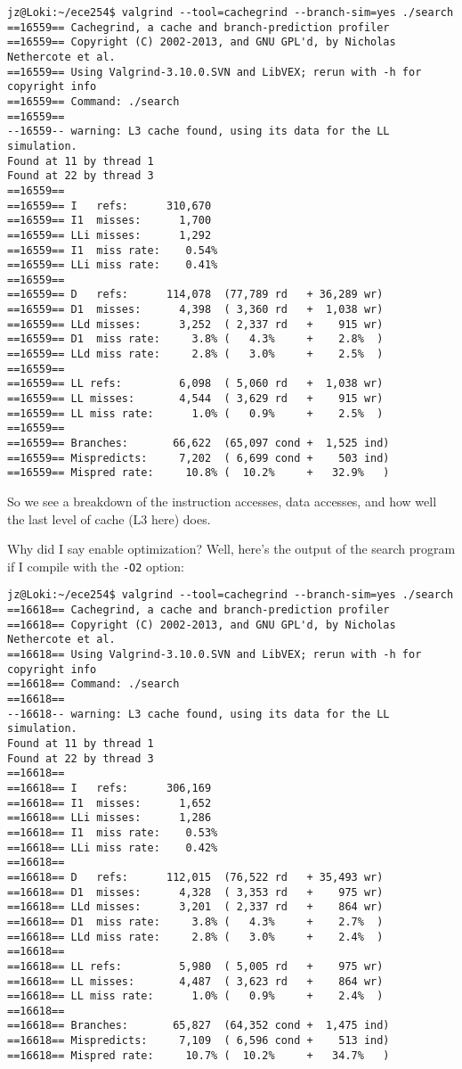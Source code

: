 \begin{verbatim}
jz@Loki:~/ece254$ valgrind --tool=cachegrind --branch-sim=yes ./search
==16559== Cachegrind, a cache and branch-prediction profiler
==16559== Copyright (C) 2002-2013, and GNU GPL'd, by Nicholas Nethercote et al.
==16559== Using Valgrind-3.10.0.SVN and LibVEX; rerun with -h for copyright info
==16559== Command: ./search
==16559== 
--16559-- warning: L3 cache found, using its data for the LL simulation.
Found at 11 by thread 1 
Found at 22 by thread 3 
==16559== 
==16559== I   refs:      310,670
==16559== I1  misses:      1,700
==16559== LLi misses:      1,292
==16559== I1  miss rate:    0.54%
==16559== LLi miss rate:    0.41%
==16559== 
==16559== D   refs:      114,078  (77,789 rd   + 36,289 wr)
==16559== D1  misses:      4,398  ( 3,360 rd   +  1,038 wr)
==16559== LLd misses:      3,252  ( 2,337 rd   +    915 wr)
==16559== D1  miss rate:     3.8% (   4.3%     +    2.8%  )
==16559== LLd miss rate:     2.8% (   3.0%     +    2.5%  )
==16559== 
==16559== LL refs:         6,098  ( 5,060 rd   +  1,038 wr)
==16559== LL misses:       4,544  ( 3,629 rd   +    915 wr)
==16559== LL miss rate:      1.0% (   0.9%     +    2.5%  )
==16559== 
==16559== Branches:       66,622  (65,097 cond +  1,525 ind)
==16559== Mispredicts:     7,202  ( 6,699 cond +    503 ind)
==16559== Mispred rate:     10.8% (  10.2%     +   32.9%   )

\end{verbatim}

So we see a breakdown of the instruction accesses, data accesses, and how well the last level of cache (L3 here) does. 

Why did I say enable optimization? Well, here's the output of the search program if I compile with the \texttt{-O2} option:

\begin{verbatim}
jz@Loki:~/ece254$ valgrind --tool=cachegrind --branch-sim=yes ./search
==16618== Cachegrind, a cache and branch-prediction profiler
==16618== Copyright (C) 2002-2013, and GNU GPL'd, by Nicholas Nethercote et al.
==16618== Using Valgrind-3.10.0.SVN and LibVEX; rerun with -h for copyright info
==16618== Command: ./search
==16618== 
--16618-- warning: L3 cache found, using its data for the LL simulation.
Found at 11 by thread 1 
Found at 22 by thread 3 
==16618== 
==16618== I   refs:      306,169
==16618== I1  misses:      1,652
==16618== LLi misses:      1,286
==16618== I1  miss rate:    0.53%
==16618== LLi miss rate:    0.42%
==16618== 
==16618== D   refs:      112,015  (76,522 rd   + 35,493 wr)
==16618== D1  misses:      4,328  ( 3,353 rd   +    975 wr)
==16618== LLd misses:      3,201  ( 2,337 rd   +    864 wr)
==16618== D1  miss rate:     3.8% (   4.3%     +    2.7%  )
==16618== LLd miss rate:     2.8% (   3.0%     +    2.4%  )
==16618== 
==16618== LL refs:         5,980  ( 5,005 rd   +    975 wr)
==16618== LL misses:       4,487  ( 3,623 rd   +    864 wr)
==16618== LL miss rate:      1.0% (   0.9%     +    2.4%  )
==16618== 
==16618== Branches:       65,827  (64,352 cond +  1,475 ind)
==16618== Mispredicts:     7,109  ( 6,596 cond +    513 ind)
==16618== Mispred rate:     10.7% (  10.2%     +   34.7%   )
\end{verbatim}

